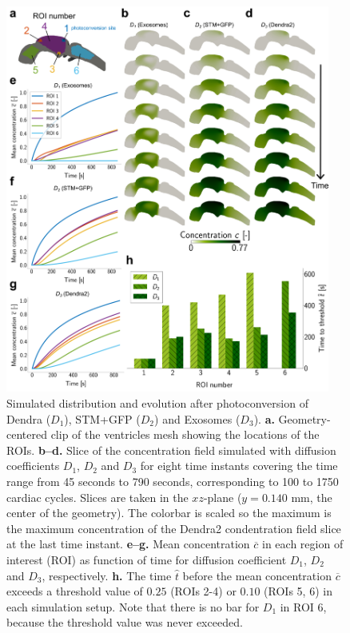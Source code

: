 \documentclass[fleqn]{wlscirep}
\newcommand{\cbar}{\overline{c}}
\begin{document}
\begin{figure}%
    \centering
    \includegraphics[width=0.95\textwidth]{graphics/figure2_simulation_results_different_coeffs.png}
    \caption{Simulated distribution and evolution after photoconversion of
    Dendra ($D_1$), STM+GFP ($D_2$) and Exosomes ($D_3$).
    \textbf{a.} Geometry-centered clip of the ventricles mesh showing the locations of the ROIs.
    \textbf{b--d.} Slice of the concentration field simulated
    with diffusion coefficients $D_1$, $D_2$ and $D_3$ for eight time instants covering the
    time range from 45 seconds to 790 seconds, corresponding to 100 to 1750 cardiac cycles.
    Slices are taken in the $xz$-plane ($y=0.140$ mm, the center of the geometry).
    The colorbar is scaled so the maximum is the maximum concentration of the Dendra2 
    condentration field slice at the last time instant.
    \textbf{e--g.} Mean concentration $\cbar$ in each region of interest (ROI)
    as function of time for diffusion coefficient $D_1$, $D_2$ and $D_3$, respectively. 
    \textbf{h.} The time $\hat{t}$ before the mean concentration $\cbar$ exceeds a
    threshold value of $0.25$ (ROIs 2-4) or $0.10$ (ROIs 5, 6) in each simulation setup.
    Note that there is no bar for $D_1$ in ROI 6, because the threshold value was never exceeded.}
    \label{fig:fig2}
\end{figure}
\end{document}

